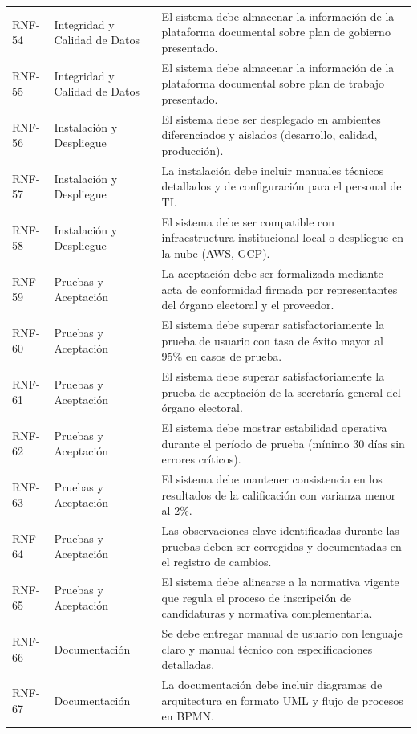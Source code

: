 \documentclass[12pt,a4paper,oneside]{book}
\begin{document}
\begin{longtable}{@{}>{\centering\arraybackslash}p{2cm}
                    >{\centering\arraybackslash}p{3cm}
                    >{\raggedright\arraybackslash}p{10cm}@{}}
RNF-54 & Integridad y Calidad de Datos & El sistema debe almacenar la información de la plataforma documental sobre plan de gobierno presentado. \\
RNF-55 & Integridad y Calidad de Datos & El sistema debe almacenar la información de la plataforma documental sobre plan de trabajo presentado. \\
\midrule
RNF-56 & Instalación y Despliegue & El sistema debe ser desplegado en ambientes diferenciados y aislados (desarrollo, calidad, producción). \\
RNF-57 & Instalación y Despliegue & La instalación debe incluir manuales técnicos detallados y de configuración para el personal de TI. \\
RNF-58 & Instalación y Despliegue & El sistema debe ser compatible con infraestructura institucional local o despliegue en la nube (AWS, GCP). \\
\midrule
RNF-59 & Pruebas y Aceptación & La aceptación debe ser formalizada mediante acta de conformidad firmada por representantes del órgano electoral y el proveedor. \\
RNF-60 & Pruebas y Aceptación & El sistema debe superar satisfactoriamente la prueba de usuario con tasa de éxito mayor al 95\% en casos de prueba. \\
RNF-61 & Pruebas y Aceptación & El sistema debe superar satisfactoriamente la prueba de aceptación de la secretaría general del órgano electoral. \\
RNF-62 & Pruebas y Aceptación & El sistema debe mostrar estabilidad operativa durante el período de prueba (mínimo 30 días sin errores críticos). \\
RNF-63 & Pruebas y Aceptación & El sistema debe mantener consistencia en los resultados de la calificación con varianza menor al 2\%. \\
RNF-64 & Pruebas y Aceptación & Las observaciones clave identificadas durante las pruebas deben ser corregidas y documentadas en el registro de cambios. \\
RNF-65 & Pruebas y Aceptación & El sistema debe alinearse a la normativa vigente que regula el proceso de inscripción de candidaturas y normativa complementaria. \\
\midrule
RNF-66 & Documentación & Se debe entregar manual de usuario con lenguaje claro y manual técnico con especificaciones detalladas. \\
RNF-67 & Documentación & La documentación debe incluir diagramas de arquitectura en formato UML y flujo de procesos en BPMN. \\

\end{longtable}
\end{document}
